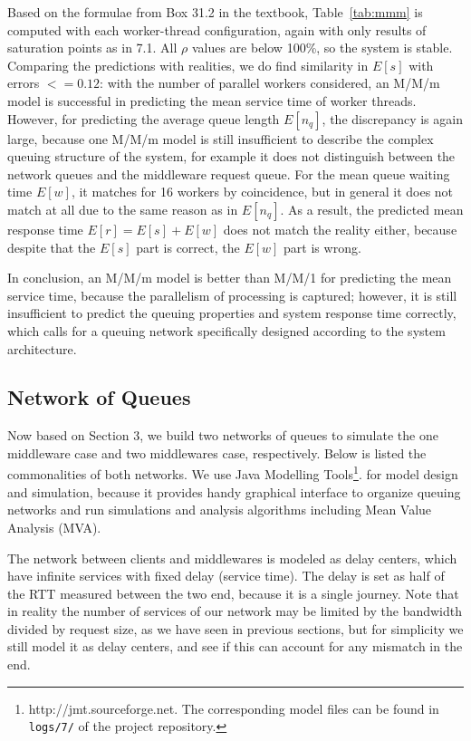 Based on the formulae from Box 31.2 in the textbook, Table~\ref{tab:mmm} is computed with each worker-thread configuration, again with only results of saturation points as in 7.1. All $\rho$ values are below 100\%, so the system is stable. Comparing the predictions with realities, we do find similarity in $E[s]$ with errors $<= 0.12$: with the number of parallel workers considered, an M/M/m model is successful in predicting the mean service time of worker threads. However, for predicting the average queue length $E[n_q]$, the discrepancy is again large, because one M/M/m model is still insufficient to describe the complex queuing structure of the system, for example it does not distinguish between the network queues and the middleware request queue. For the mean queue waiting time $E[w]$, it matches for 16 workers by coincidence, but in general it does not match at all due to the same reason as in $E[n_q]$. As a result, the predicted mean response time $E[r] = E[s] + E[w]$ does not match the reality either, because despite that the $E[s]$ part is correct, the $E[w]$ part is wrong.

In conclusion, an M/M/m model is better than M/M/1 for predicting the mean service time, because the parallelism of processing is captured; however, it is still insufficient to predict the queuing properties and system response time correctly, which calls for a queuing network specifically designed according to the system architecture.


\subsection{Network of Queues}

Now based on Section 3, we build two networks of queues to simulate the one middleware case and two middlewares case, respectively. Below is listed the commonalities of both networks. We use Java Modelling Tools\footnote{http://jmt.sourceforge.net. The corresponding model files can be found in \texttt{logs/7/} of the project repository.}. for model design and simulation, because it provides handy graphical interface to organize queuing networks and run simulations and analysis algorithms including Mean Value Analysis (MVA).

The network between clients and middlewares is modeled as delay centers, which have infinite services with fixed delay (service time). The delay is set as half of the RTT measured between the two end, because it is a single journey. Note that in reality the number of services of our network may be limited by the bandwidth divided by request size, as we have seen in previous sections, but for simplicity we still model it as delay centers, and see if this can account for any mismatch in the end.

